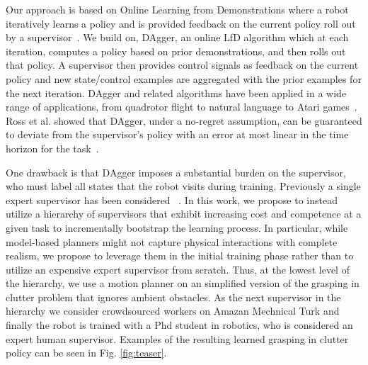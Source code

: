 \documentclass[10pt, conference]{ieeeconf}      %
\begin{document}
Our approach is based on Online Learning from Demonstrations where a robot iteratively learns a policy and is
provided feedback on the current policy roll out by a supervisor~\cite{grollman2007dogged,ross2010efficient,ross2010reduction}. 
We build on, DAgger, an online LfD algorithm which at each iteration, computes a policy based on prior demonstrations,
and then rolls out that policy. A supervisor then provides control signals as feedback on the current policy
and new state/control examples are aggregated with the prior examples for the next iteration. DAgger and related algorithms have been applied in a wide range of applications, from quadrotor flight to natural language to Atari games~\cite{NIPS2014_5421,duvallet2013imitation,ross2013learning}. 
Ross et al. showed that DAgger, under a no-regret assumption, can be guaranteed to deviate from the supervisor's policy with an error
at most linear in the time horizon for the task~\cite{ross2010reduction}.

One drawback is that DAgger imposes a substantial burden on the supervisor, who must label all states that the robot
visits during training.  Previously a single expert supervisor has been considered 
~\cite{ross2010efficient,ross2010reduction,ross2013learning,duvallet2013imitation}. In this work, we propose to instead
utilize a hierarchy of supervisors that exhibit increasing cost and competence at a given task to incrementally
bootstrap the learning process. In particular, while model-based planners might not capture physical interactions with
complete realism, we propose to leverage them in the initial training phase rather than to utilize an expensive
expert supervisor from scratch. Thus, at the lowest level of the hierarchy, we use a motion planner on an simplified
version of the grasping in clutter problem that ignores ambient obstacles. As the next supervisor in the hierarchy 
we consider crowdsourced workers on Amazan Mechnical Turk and finally the robot is trained with a Phd student in
robotics, who is considered an expert human supervisor. Examples of the resulting learned grasping in clutter policy can be seen in Fig. \ref{fig:teaser}. 

\end{document}
